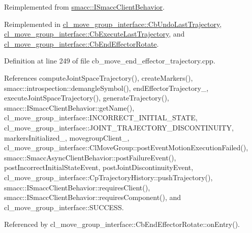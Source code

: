 Reimplemented from \hyperlink{classsmacc_1_1ISmaccClientBehavior_a9877684b1954429719826e2d0924d980}{smacc\+::\+I\+Smacc\+Client\+Behavior}.



Reimplemented in \hyperlink{classcl__move__group__interface_1_1CbUndoLastTrajectory_a3c55fa93ff65d8eccb8cc14a420cb7b2}{cl\+\_\+move\+\_\+group\+\_\+interface\+::\+Cb\+Undo\+Last\+Trajectory}, \hyperlink{classcl__move__group__interface_1_1CbExecuteLastTrajectory_ac78713663c39635ca5ac9a749503e800}{cl\+\_\+move\+\_\+group\+\_\+interface\+::\+Cb\+Execute\+Last\+Trajectory}, and \hyperlink{classcl__move__group__interface_1_1CbEndEffectorRotate_a3e60bfba48906696587d66af89f7ee2b}{cl\+\_\+move\+\_\+group\+\_\+interface\+::\+Cb\+End\+Effector\+Rotate}.



Definition at line 249 of file cb\+\_\+move\+\_\+end\+\_\+effector\+\_\+trajectory.\+cpp.



References compute\+Joint\+Space\+Trajectory(), create\+Markers(), smacc\+::introspection\+::demangle\+Symbol(), end\+Effector\+Trajectory\+\_\+, execute\+Joint\+Space\+Trajectory(), generate\+Trajectory(), smacc\+::\+I\+Smacc\+Client\+Behavior\+::get\+Name(), cl\+\_\+move\+\_\+group\+\_\+interface\+::\+I\+N\+C\+O\+R\+R\+E\+C\+T\+\_\+\+I\+N\+I\+T\+I\+A\+L\+\_\+\+S\+T\+A\+TE, cl\+\_\+move\+\_\+group\+\_\+interface\+::\+J\+O\+I\+N\+T\+\_\+\+T\+R\+A\+J\+E\+C\+T\+O\+R\+Y\+\_\+\+D\+I\+S\+C\+O\+N\+T\+I\+N\+U\+I\+TY, markers\+Initialized\+\_\+, movegroup\+Client\+\_\+, cl\+\_\+move\+\_\+group\+\_\+interface\+::\+Cl\+Move\+Group\+::post\+Event\+Motion\+Execution\+Failed(), smacc\+::\+Smacc\+Async\+Client\+Behavior\+::post\+Failure\+Event(), post\+Incorrect\+Initial\+State\+Event, post\+Joint\+Discontinuity\+Event, cl\+\_\+move\+\_\+group\+\_\+interface\+::\+Cp\+Trajectory\+History\+::push\+Trajectory(), smacc\+::\+I\+Smacc\+Client\+Behavior\+::requires\+Client(), smacc\+::\+I\+Smacc\+Client\+Behavior\+::requires\+Component(), and cl\+\_\+move\+\_\+group\+\_\+interface\+::\+S\+U\+C\+C\+E\+SS.



Referenced by cl\+\_\+move\+\_\+group\+\_\+interface\+::\+Cb\+End\+Effector\+Rotate\+::on\+Entry().


